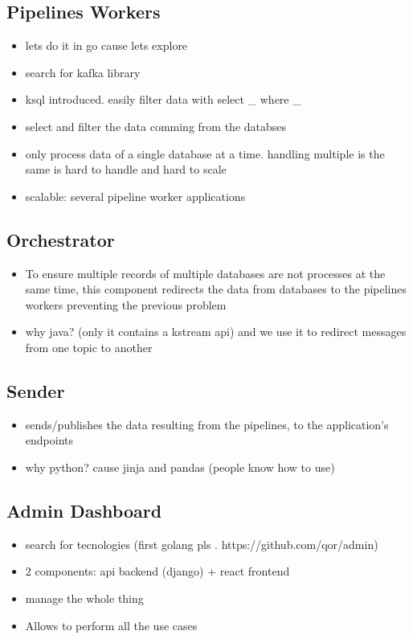 \subsection{Pipelines Workers}
\begin{itemize}
    \item lets do it in go cause lets explore
    \item search for kafka library
    \item ksql introduced. easily filter data with select \_ where \_
    \item select and filter the data comming from the databses
    \item only process data of a single database at a time. handling multiple is the same is hard to handle and hard to scale
    \item scalable: several pipeline worker applications
\end{itemize}

\subsection{Orchestrator}
\begin{itemize}
    \item To ensure multiple records of multiple databases are not processes at the same time, this component redirects the data from databases to the pipelines workers preventing the previous problem
    \item why java? (only it contains a kstream api) and we use it to redirect messages from one topic to another
\end{itemize}

\subsection{Sender}
\begin{itemize}
    \item sends/publishes the data resulting from the pipelines, to the application's endpoints
    \item why python? cause jinja and pandas (people know how to use)
\end{itemize}

\subsection{Admin Dashboard}

\begin{itemize}
    \item search for tecnologies (first golang pls . https://github.com/qor/admin)
    \item 2 components: api backend (django) + react frontend
    \item manage the whole thing
    \item Allows to perform all the use cases
\end{itemize}

